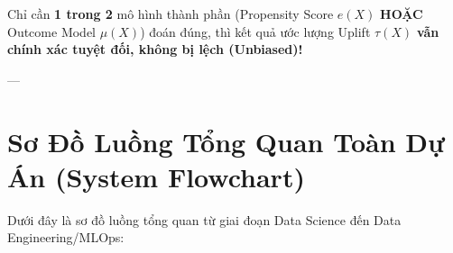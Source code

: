 \documentclass[11pt,a4paper]{article}
\begin{document}
\begin{summarybox}
Chỉ cần \textbf{1 trong 2} mô hình thành phần (Propensity Score $e(X)$ \textbf{HOẶC} Outcome Model $\mu(X)$) đoán đúng, thì kết quả ước lượng Uplift $\tau(X)$ \textbf{vẫn chính xác tuyệt đối, không bị lệch (Unbiased)!}
\end{summarybox}

---

\section{Sơ Đồ Luồng Tổng Quan Toàn Dự Án (System Flowchart)}

Dưới đây là sơ đồ luồng tổng quan từ giai đoạn Data Science đến Data Engineering/MLOps:

\vspace{0.8em}
\end{document}
